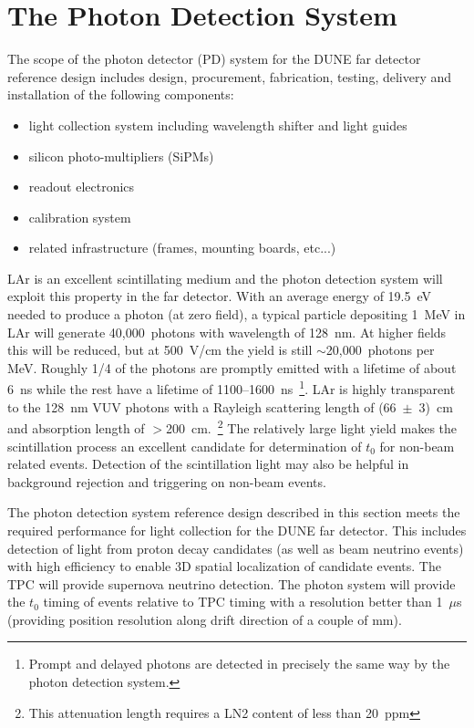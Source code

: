 \section{The Photon Detection System}
\label{sec:detectors-fd-ref-pd}

The scope of the photon detector (PD) system for the DUNE far detector
reference design includes design, procurement, fabrication,
testing, delivery and installation of the following components:
\begin{itemize}
\item light collection system including wavelength shifter and light guides
\item silicon photo-multipliers (SiPMs)
\item readout electronics
\item calibration system
\item related infrastructure (frames, mounting boards, etc...)
\end{itemize}

LAr is an excellent scintillating medium and the photon detection
system will exploit this property in the far detector.  With an
average energy of 19.5~eV needed to produce a photon (at zero field),
a typical particle depositing 1~MeV in LAr will generate
40,000~photons with wavelength of 128~nm. At higher fields this will
be reduced, but at 500~V/cm the yield is still $\sim$20,000~photons
per MeV. Roughly 1/4 of the photons are promptly emitted with a
lifetime of about 6~ns while the rest have a lifetime of
1100--1600~ns~\footnote{Prompt and delayed photons are detected in
  precisely the same way by the photon detection system.}. LAr is
highly transparent to the 128~nm VUV photons with a Rayleigh
scattering length of (66~$\pm$~3)~cm~\cite{Rayleigh} and absorption
length of $>$200~cm.~\footnote{This attenuation length requires a LN2
  content of less than 20~ppm} The relatively large light yield makes
the scintillation process an excellent candidate for determination of
$t_0$ for non-beam related events. Detection of the scintillation
light may also be helpful in background rejection and triggering on
non-beam events.

The photon detection system reference design described in this section
meets the required performance for light collection for the DUNE far
detector. This includes detection of light from proton decay
candidates (as well as beam neutrino events) with high efficiency to
enable 3D spatial localization of candidate events. The TPC will
provide supernova neutrino detection. 
The photon system will provide the $t_0$ timing of
events relative to TPC timing with a resolution better than 1~$\mu$s
(providing position resolution along drift direction of a couple of mm). 

